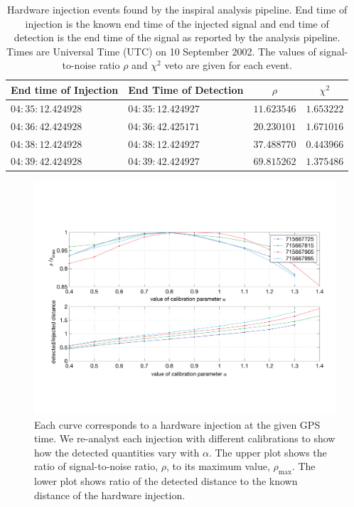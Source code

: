 \begin{table}[p]
  \begin{flushright}
  \begin{tabular}{l|l|c|c}
  End time of Injection&End Time of Detection&$\rho$&$\chi^2$\\
  \hline
  $04:35:12.424928$ & $04:35:12.424927$ & $11.623546$ & $1.653222$ \\
  $04:36:42.424928$ & $04:36:42.425171$ & $20.230101$ & $1.671016$ \\
  $04:38:12.424928$ & $04:38:12.424927$ & $37.488770$ & $0.443966$ \\
  $04:39:42.424928$ & $04:39:42.424927$ & $69.815262$ & $1.375486$ \\
  \end{tabular}
  \end{flushright}
  \caption[Hardware Injections Found by the Analysis Pipeline]{%
  Hardware injection events found by the inspiral analysis pipeline. End time
  of injection is the known end time of the injected signal and end time of
  detection is the end time of the signal as reported by the analysis
  pipeline. Times are Universal Time (UTC) on 10 September 2002. The values of
  signal-to-noise ratio $\rho$ and $\chi^2$ veto are given for each event.
  }
\label{t:triggers}
\end{table}

\begin{figure}[p]
  \vspace{5pt}
  \begin{flushright}
    \includegraphics[width=\textwidth]{figures/hardware/calibration}    
  \end{flushright}
  \caption[Study of Calibration Using Hardware Injections]{%
  Each curve corresponds to a hardware injection at the given GPS time. We
  re-analyst each injection with different calibrations to show how the
  detected quantities vary with $\alpha$. The upper plot shows the ratio of
  signal-to-noise ratio, $\rho$, to its maximum value, $\rho_{\mathrm{max}}$.
  The lower plot shows ratio of the detected distance to the known distance of
  the hardware injection.
  }
\label{f:calibration}
\end{figure}

